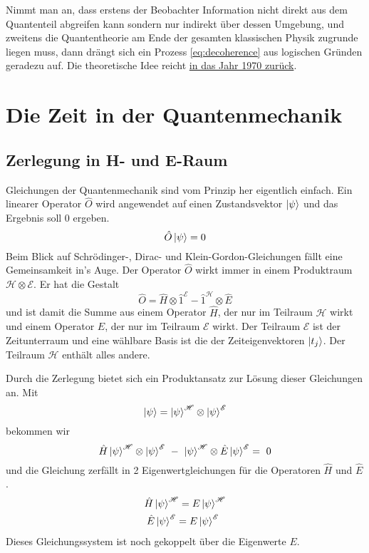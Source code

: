 \documentclass[12pt]{article}
\begin{document}
Nimmt man an, dass erstens der Beobachter Information nicht direkt aus dem Quantenteil abgreifen kann sondern nur indirekt über dessen Umgebung, und zweitens die Quantentheorie am Ende der gesamten klassischen Physik zugrunde liegen muss, dann drängt sich ein Prozess \eqref{eq:decoherence} aus logischen Gründen geradezu auf. Die theoretische Idee reicht \href{https://de.wikipedia.org/wiki/Dieter_Zeh}{in das Jahr 1970 zurück}.
 

\section{Die Zeit in der Quantenmechanik}
\subsection{Zerlegung in H- und E-Raum}
Gleichungen der Quantenmechanik sind vom Prinzip her eigentlich einfach. Ein linearer Operator $\hat{O}$ wird angewendet auf einen Zustandsvektor $\ket{\psi}$ und das Ergebnis soll $0$ ergeben.
\begin{equation*} 
\hat{O}\ket{\psi} = 0 
\end{equation*}
Beim Blick auf Schrödinger-, Dirac- und Klein-Gordon-Gleichungen fällt eine Gemeinsamkeit in's Auge. Der Operator $\hat{O}$ wirkt immer in einem Produktraum $\mathscr{H} \otimes \mathscr{E}$. Er hat die Gestalt 
\begin{equation*} 
\hat{O} = \hat{H} \otimes \hat{1}^{\mathscr{E}} - \hat{1}^{\mathscr{H}} \otimes \hat{E}
\end{equation*}
und ist damit die Summe aus einem Operator $\hat{H}$, der nur im Teilraum $\mathscr{H}$ wirkt und einem Operator $\hat{E}$, der nur im Teilraum $\mathscr{E}$ wirkt. Der Teilraum $\mathscr{E}$ ist der Zeitunterraum und eine wählbare Basis ist die der Zeiteigenvektoren $\ket{t_j}$. Der Teilraum $\mathscr{H}$ enthält alles andere.

Durch die Zerlegung bietet sich ein Produktansatz zur Lösung dieser Gleichungen an. Mit
\begin{equation*} 
\ket{\psi} = \ket{\psi}^{\mathscr{H}} \otimes \ket{\psi}^{\mathscr{E}}
\end{equation*}
bekommen wir
\begin{equation} 
\label{eq:productspace}
\hat{H}\ket{\psi}^{\mathscr{H}} \otimes \ket{\psi}^{\mathscr{E}} 
\ - \ 
\ket{\psi}^{\mathscr{H}} \otimes \hat{E}\ket{\psi}^{\mathscr{E}} =\ 0
\end{equation}
und die Gleichung zerfällt in 2 Eigenwertgleichungen für die Operatoren $\hat{H}$ und $\hat{E}$.
\begin{equation}
\label{eq:system}
\begin{split}
\hat{H}\ket{\psi}^{\mathscr{H}} = E\ket{\psi}^{\mathscr{H}}\\
\hat{E}\ket{\psi}^{\mathscr{E}} = E\ket{\psi}^{\mathscr{E}}\ \ 
\end{split}
\end{equation}
Dieses Gleichungssystem ist noch gekoppelt über die Eigenwerte $E$. 
\end{document}
